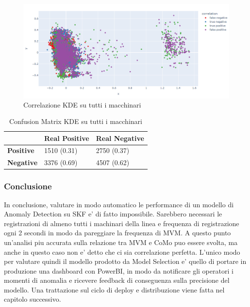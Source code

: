 \begin{figure}[t]
	\centering
	\includegraphics[width=14cm, scale=1]{images/correlation_all_quality_plot.png}
	\caption{Correlazione KDE su tutti i macchinari}
	\label{quality_all_machines}
\end{figure}

\begin{table}[]
	\centering
	\begin{tabular}{|l|l|l|}
		\hline
		                  & \textbf{Real Positive} & \textbf{Real Negative} \\ \hline
		\textbf{Positive} & 1510 (0.31)            & 2750 (0.37)            \\ \hline
		\textbf{Negative} & 3376 (0.69)            & 4507 (0.62)            \\ \hline
	\end{tabular}
	\caption{\label{cm_quality_all}Confusion Matrix KDE su tutti i macchinari}
	
\end{table}

\subsubsection{Conclusione}
In conclusione, valutare in modo automatico le performance di un modello di Anomaly Detection su SKF e' di fatto impossibile. Sarebbero necessari le registrazioni di almeno tutti i machinari della linea e frequenza di registrazione ogni 2 secondi in modo da pareggiare la frequenza di MVM. A questo punto un'analisi piu accurata sulla relazione tra MVM e CoMo puo essere svolta, ma anche in questo caso non e' detto che ci sia correlazione perfetta.
L'unico modo per valutare quindi il modello prodotto da Model Selection e' quello di portare in produzione una dashboard con PowerBI, in modo da notificare gli operatori i momenti di anomalia e ricevere feedback di conseguenza sulla precisione del modello.
Una trattazione sul ciclo di deploy e distribuzione viene fatta nel capitolo successivo.